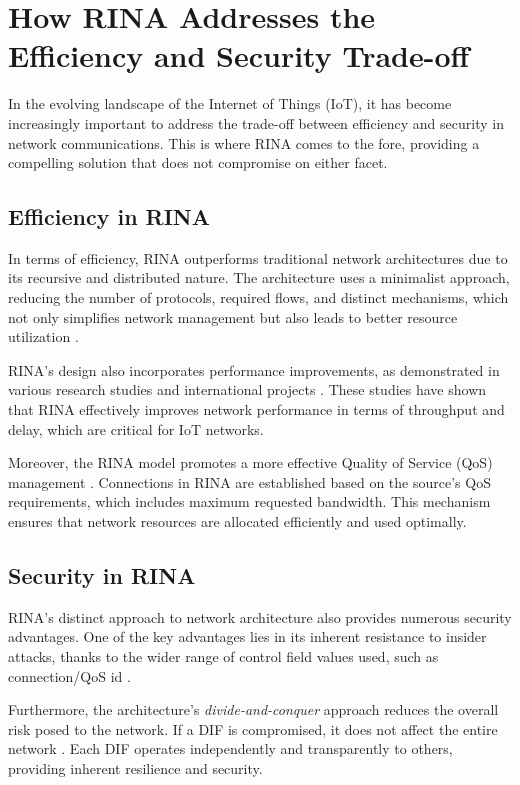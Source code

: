 \documentclass{ieeeaccess}
\begin{document}
\section{How RINA Addresses the Efficiency and Security Trade-off} \label{sec:rina-tradeoff}
In the evolving landscape of the Internet of Things (IoT), it has become increasingly important to address the trade-off between efficiency and security in network communications. This is where RINA comes to the fore, providing a compelling solution that does not compromise on either facet.

\subsection{Efficiency in RINA}

In terms of efficiency, RINA outperforms traditional network architectures due to its recursive and distributed nature. The architecture uses a minimalist approach, reducing the number of protocols, required flows, and distinct mechanisms, which not only simplifies network management but also leads to better resource utilization \cite{small2012}.

RINA's design also incorporates performance improvements, as demonstrated in various research studies and international projects \cite{trouva2010internet, peymanICC16}. These studies have shown that RINA effectively improves network performance in terms of throughput and delay, which are critical for IoT networks.

Moreover, the RINA model promotes a more effective Quality of Service (QoS) management \cite{gaixas2016assuring}. Connections in RINA are established based on the source's QoS requirements, which includes maximum requested bandwidth. This mechanism ensures that network resources are allocated efficiently and used optimally.

\subsection{Security in RINA}

RINA's distinct approach to network architecture also provides numerous security advantages. One of the key advantages lies in its inherent resistance to insider attacks, thanks to the wider range of control field values used, such as connection/QoS id \cite{boddapati2012assessing}.

Furthermore, the architecture's \textit{divide-and-conquer} approach reduces the overall risk posed to the network. If a DIF is compromised, it does not affect the entire network \cite{day2008networking}. Each DIF operates independently and transparently to others, providing inherent resilience and security.
\end{document}
